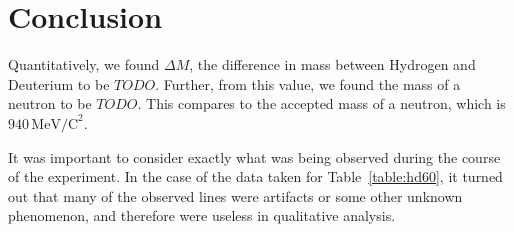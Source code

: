\documentclass[paper=a4, fontsize=11pt]{scrartcl} %
\numberwithin{equation}{section}
\numberwithin{figure}{section}
\numberwithin{table}{section}
\begin{document}














\section{Conclusion}

Quantitatively, we found $\Delta M$, the difference in mass between Hydrogen and Deuterium to be $TODO$. Further, from this value, we found the mass of a neutron to be $TODO$. This compares to the accepted mass of a neutron, which is $940 \, \mathrm{MeV/C}^2$.


It was important to consider exactly what was being observed during the course of the experiment. In the case of the data taken for Table~\ref{table:hd60}, it turned out that many of the observed lines were artifacts or some other unknown phenomenon, and therefore were useless in qualitative analysis.
\end{document}
